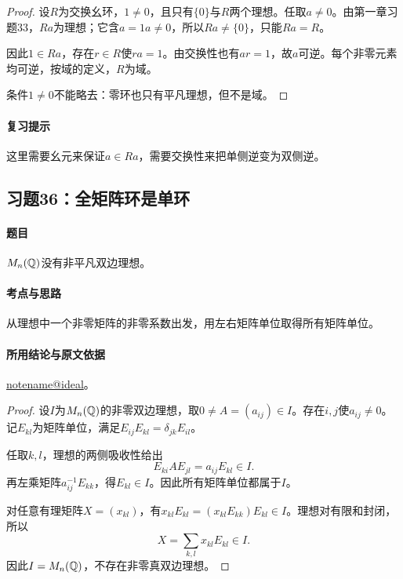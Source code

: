 \documentclass[UTF8,a4paper,11pt,fontset=windows]{ctexart}
\makeatletter
\newcommand{\noteref}[1]{\hyperref[note:#1]{\csname notename@#1\endcsname}}
\newcommand{\exref}[2]{\hyperref[ex:#1:#2]{第#1章习题#2}}
\makeatother
\begin{document}

\begin{proof}
设$R$为交换幺环，$1\ne0$，且只有$\{0\}$与$R$两个理想。任取$a\ne0$。由第一章习题33，$Ra$为理想；它含$a=1a\ne0$，所以$Ra\ne\{0\}$，只能$Ra=R$。

因此$1\in Ra$，存在$r\in R$使$ra=1$。由交换性也有$ar=1$，故$a$可逆。每个非零元素均可逆，按域的定义，$R$为域。

条件$1\ne0$不能略去：零环也只有平凡理想，但不是域。
\end{proof}

\paragraph{复习提示}
这里需要幺元来保证$a\in Ra$，需要交换性来把单侧逆变为双侧逆。


\subsection{习题36：\texorpdfstring{全矩阵环是单环}{全矩阵环是单环}}
\label{ex:1:36}

\paragraph{题目}
$M_n(\mathbb Q)$没有非平凡双边理想。

\paragraph{考点与思路}
从理想中一个非零矩阵的非零系数出发，用左右矩阵单位取得所有矩阵单位。

\paragraph{所用结论与原文依据}
\noteref{ideal}。


\begin{proof}
设$I$为$M_n(\mathbb Q)$的非零双边理想，取$0\ne A=(a_{ij})\in I$。存在$i,j$使$a_{ij}\ne0$。记$E_{kl}$为矩阵单位，满足$E_{ij}E_{kl}=\delta_{jk}E_{il}$。

任取$k,l$，理想的两侧吸收性给出
\[
E_{ki}AE_{jl}=a_{ij}E_{kl}\in I.
\]
再左乘矩阵$a_{ij}^{-1}E_{kk}$，得$E_{kl}\in I$。因此所有矩阵单位都属于$I$。

对任意有理矩阵$X=(x_{kl})$，有$x_{kl}E_{kl}=(x_{kl}E_{kk})E_{kl}\in I$。理想对有限和封闭，所以
\[
X=\sum_{k,l}x_{kl}E_{kl}\in I.
\]
因此$I=M_n(\mathbb Q)$，不存在非零真双边理想。
\end{proof}
\end{document}

